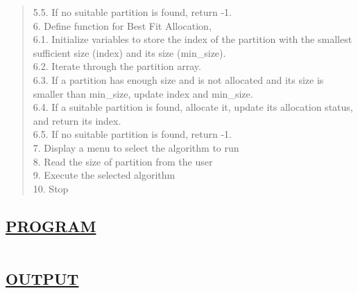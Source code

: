 \documentclass[a4paper, 12pt]{article}
\begin{document}
\begin{quote}
\hspace*{1cm} 5.5. If no suitable partition is found, return -1.\\
6. Define function for Best Fit Allocation,\\
\hspace*{1cm} 6.1. Initialize variables to store the index of the partition with the smallest \hspace*{2cm} sufficient size (index) and its size (min\_size).\\
\hspace*{1cm} 6.2. Iterate through the partition array.\\
\hspace*{1cm} 6.3. If a partition has enough size and is not allocated and its size is smaller than \hspace*{2cm} min\_size, update index and min\_size.\\
\hspace*{1cm} 6.4. If a suitable partition is found, allocate it, update its allocation status, and \hspace*{2cm} return its index.\\
\hspace*{1cm} 6.5. If no suitable partition is found, return -1.\\
7. Display a menu to select the algorithm to run\\
8. Read the size of partition from the user\\
9. Execute the selected algorithm\\
10. Stop\\
\end{quote}

\subsection*{\underline{PROGRAM}}
\begin{quote}
\inputminted[fontsize=\small,breaklines,breakanywhere]{c}{memory_allocation.c}
\end{quote}

\newpage
\subsection*{\underline{OUTPUT}}

\begin{figure}[H] 
    \centering
\end{figure}
\end{document}
